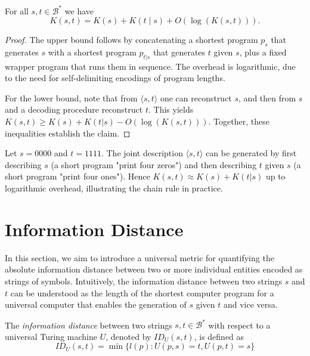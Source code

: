 \begin{proposition}
\label{prop:kolmogorov_chain_rule}
For all $s, t \in \mathcal{B}^{\ast}$ we have
\[
K(s, t) = K(s) + K(t \mid s) + O(\log(K(s,t))).
\]
\end{proposition}
\begin{proof}
The upper bound follows by concatenating a shortest program $p_s$ that generates $s$ with a shortest program $p_{t|s}$ that generates $t$ given $s$, plus a fixed wrapper program that runs them in sequence. The overhead is logarithmic, due to the need for self-delimiting encodings of program lengths.  

For the lower bound, note that from $\langle s,t\rangle$ one can reconstruct $s$, and then from $s$ and a decoding procedure reconstruct $t$. This yields $K(s,t) \ge K(s) + K(t|s) - O(\log(K(s,t)))$. Together, these inequalities establish the claim.
\end{proof}

\begin{example}
Let $s = 0000$ and $t = 1111$. The joint description $\langle s,t\rangle$ can be generated by first describing $s$ (a short program "print four zeros") and then describing $t$ given $s$ (a short program "print four ones"). Hence $K(s,t) \approx K(s) + K(t|s)$ up to logarithmic overhead, illustrating the chain rule in practice.
\end{example}

%
%

\section{Information Distance}
\label{sec:information_distance}

In this section, we aim to introduce a universal metric for quantifying the absolute information distance between two or more individual entities encoded as strings of symbols. Intuitively, the information distance between two strings $s$ and $t$ can be understood as the length of the shortest computer program for a universal computer that enables the generation of $s$ given $t$ and vice versa.

\begin{definition}
The \emph{information distance} between two strings $s,  t \in \mathcal{B}^{\ast}$ with respect to a universal Turing machine $U$, denoted by $ID_U(s, t)$, is defined as
\[
ID_U(s, t) = \min \{ l(p) : U(p, s) = t, U(p, t) = s \}
\]
\end{definition}

